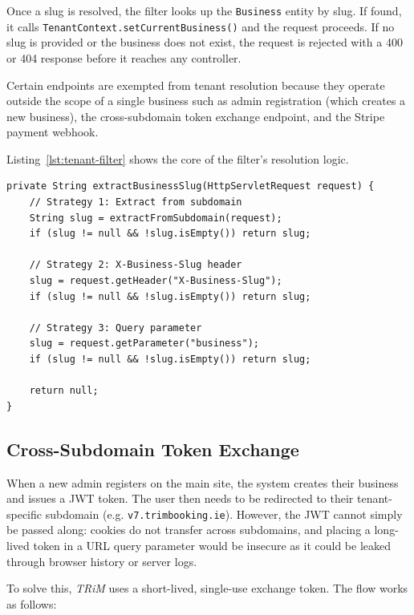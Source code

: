 Once a slug is resolved, the filter looks up the \texttt{Business} entity by slug. If found, it calls \texttt{TenantContext.setCurrentBusiness()} and the request proceeds. If no slug is provided or the business does not exist, the request is rejected with a 400 or 404 response before it reaches any controller.

Certain endpoints are exempted from tenant resolution because they operate outside the scope of a single business such as admin registration (which creates a new business), the cross-subdomain token exchange endpoint, and the Stripe payment webhook.

Listing~\ref{lst:tenant-filter} shows the core of the filter's resolution logic.

\begin{lstlisting}[caption={TenantFilter extracting business slug from multiple sources.}, label={lst:tenant-filter}]
private String extractBusinessSlug(HttpServletRequest request) {
    // Strategy 1: Extract from subdomain
    String slug = extractFromSubdomain(request);
    if (slug != null && !slug.isEmpty()) return slug;

    // Strategy 2: X-Business-Slug header
    slug = request.getHeader("X-Business-Slug");
    if (slug != null && !slug.isEmpty()) return slug;

    // Strategy 3: Query parameter
    slug = request.getParameter("business");
    if (slug != null && !slug.isEmpty()) return slug;

    return null;
}
\end{lstlisting}

\subsection*{Cross-Subdomain Token Exchange}
When a new admin registers on the main site, the system creates their business and issues a JWT token. The user then needs to be redirected to their tenant-specific subdomain (e.g. \texttt{v7.trimbooking.ie}). However, the JWT cannot simply be passed along: cookies do not transfer across subdomains, and placing a long-lived token in a URL query parameter would be insecure as it could be leaked through browser history or server logs.

To solve this, \textit{TRiM} uses a short-lived, single-use exchange token. The flow works as follows:

